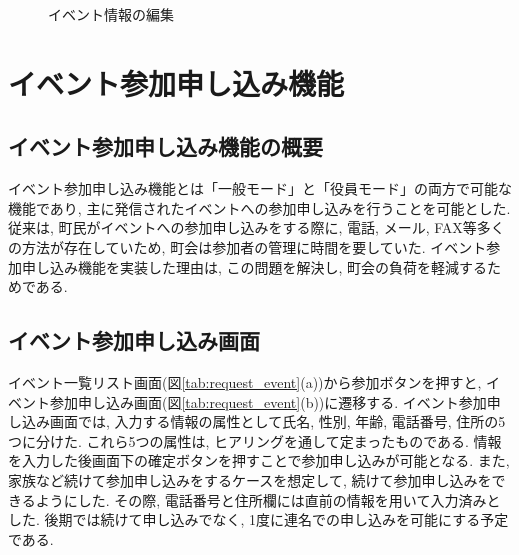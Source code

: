 \begin{figure}[htbp]
\begin{center}
\begin{tabular}{c}
    \end{tabular}
    \caption{イベント情報の編集}
    \label{tab:edit_event}
  \end{center}
\end{figure}

\section{イベント参加申し込み機能}%
\subsection{イベント参加申し込み機能の概要}%
イベント参加申し込み機能とは「一般モード」と「役員モード」の両方で可能な機能であり, 主に発信されたイベントへの参加申し込みを行うことを可能とした. 従来は, 町民がイベントへの参加申し込みをする際に, 電話, メール, FAX等多くの方法が存在していため, 町会は参加者の管理に時間を要していた. イベント参加申し込み機能を実装した理由は, この問題を解決し, 町会の負荷を軽減するためである.

\subsection{イベント参加申し込み画面}%
イベント一覧リスト画面(図\ref{tab:request_event}(a))から参加ボタンを押すと, イベント参加申し込み画面(図\ref{tab:request_event}(b))に遷移する. イベント参加申し込み画面では, 入力する情報の属性として氏名, 性別, 年齢, 電話番号, 住所の5つに分けた. これら5つの属性は, ヒアリングを通して定まったものである. 情報を入力した後画面下の確定ボタンを押すことで参加申し込みが可能となる. また, 家族など続けて参加申し込みをするケースを想定して, 続けて参加申し込みをできるようにした. その際, 電話番号と住所欄には直前の情報を用いて入力済みとした. 後期では続けて申し込みでなく, 1度に連名での申し込みを可能にする予定である.

